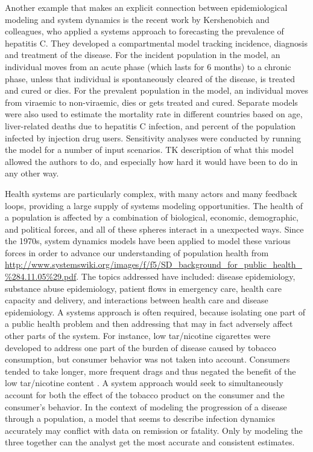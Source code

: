 Another example that makes an explicit connection between
epidemiological modeling and system dynamics is the recent work by
Kershenobich and colleagues, who applied a systems approach to
forecasting the prevalence of hepatitis C. They developed a
compartmental model tracking incidence, diagnosis and treatment of the
disease. For the incident population in the model, an individual moves
from an acute phase (which lasts for 6 months) to a chronic phase,
unless that individual is spontaneously cleared of the disease, is
treated and cured or dies. For the prevalent population in the model,
an individual moves from viraemic to non-viraemic, dies or gets
treated and cured. Separate models were also used to estimate the
mortality rate in different countries based on age, liver-related
deaths due to hepatitis C infection, and percent of the population
infected by injection drug users. Sensitivity analyses were conducted
by running the model for a number of input scenarios.  TK description
of what this model allowed the authors to do, and especially how hard
it would have been to do in any other way.

Health systems are particularly complex, with many actors and many
feedback loops, providing a large supply of systems modeling
opportunities. The health of a population is affected by a combination
of biological, economic, demographic, and political forces, and all of
these spheres interact in a unexpected ways. Since the 1970s, system
dynamics models have been applied to model these various forces in
order to advance our understanding of population health \cite{refs}
  from \url{http://www.systemswiki.org/images/f/f5/SD_background_for_public_health_%284.11.05%29.pdf}. The topics addressed have included: disease
  epidemiology, substance abuse epidemiology, patient flows in
  emergency care, health care capacity and delivery, and interactions
  between health care and disease epidemiology. A systems approach is
  often required, because isolating one part of a public health
  problem and then addressing that may in fact adversely affect other
  parts of the system. For instance, low tar/nicotine cigarettes were
  developed to address one part of the burden of disease caused by
  tobacco consumption, but consumer behavior was not taken into
  account. Consumers tended to take longer, more frequent drags and
  thus negated the benefit of the low tar/nicotine content
  \cite{Sterman_Learning_2006}. A system approach would
  seek to simultaneously account for both the effect of the tobacco
  product on the consumer and the consumer's behavior. In the context
  of modeling the progression of a disease through a population, a
  model that seems to describe infection dynamics accurately may
  conflict with data on remission or fatality. Only by modeling the
  three together can the analyst get the most accurate and consistent
  estimates.

